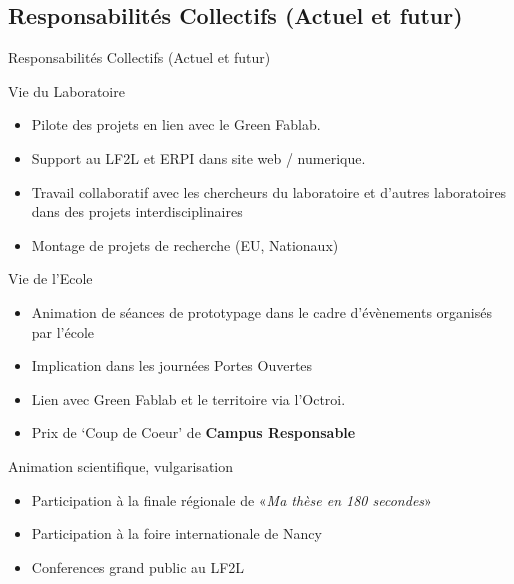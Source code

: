 \documentclass[
  11pt,
  ignorenonframetext,
  aspectratio=169,
  c]{beamer}
\providecommand{\tightlist}{%
  \setlength{\itemsep}{0pt}\setlength{\parskip}{0pt}}\usepackage{longtable,booktabs,array}
\begin{document}
\hypertarget{responsabilituxe9s-collectifs-actuel-et-futur}{%
\subsection{Responsabilités Collectifs (Actuel et
futur)}\label{responsabilituxe9s-collectifs-actuel-et-futur}}

\begin{frame}{Responsabilités Collectifs (Actuel et futur)}
\begin{block}{Vie du Laboratoire}
\protect\hypertarget{vie-du-laboratoire}{}
\scriptsize

\begin{itemize}
\tightlist
\item
  Pilote des projets en lien avec le Green Fablab.
\item
  Support au LF2L et ERPI dans site web / numerique.
\item
  Travail collaboratif avec les chercheurs du laboratoire et d'autres
  laboratoires dans des projets interdisciplinaires
\item
  Montage de projets de recherche (EU, Nationaux)
\end{itemize}
\end{block}

\begin{block}{Vie de l'Ecole}
\protect\hypertarget{vie-de-lecole}{}
\scriptsize

\begin{itemize}
\tightlist
\item
  Animation de séances de prototypage dans le cadre d'évènements
  organisés par l'école
\item
  Implication dans les journées Portes Ouvertes
\item
  Lien avec Green Fablab et le territoire via l'Octroi.
\item
  Prix de `Coup de Coeur' de \textbf{Campus Responsable}
\end{itemize}
\end{block}

\begin{block}{Animation scientifique, vulgarisation}
\protect\hypertarget{animation-scientifique-vulgarisation}{}
\scriptsize

\begin{itemize}
\tightlist
\item
  Participation à la finale régionale de «\emph{Ma thèse en 180
  secondes}»
\item
  Participation à la foire internationale de Nancy
\item
  Conferences grand public au LF2L
\end{itemize}
\end{block}
\end{frame}
\end{document}
